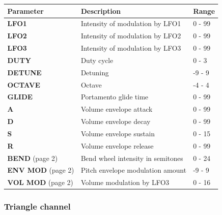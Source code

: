 \documentclass[a4paper, 12p, titlepaget]{book}
\begin{document}
\begin{tabular}{l | l | l}
  Parameter & Description & Range\\ \hline
  \textbf{LFO1} & Intensity of modulation by LFO1 & 0 - 99\\
  \textbf{LFO2} & Intensity of modulation by LFO2 & 0 - 99\\
  \textbf{LFO3} & Intensity of modulation by LFO3 & 0 - 99\\
  \textbf{DUTY} & Duty cycle & 0 - 3\\
  \textbf{DETUNE} & Detuning & -9 - 9\\
  \textbf{OCTAVE} & Octave & -4 - 4\\
  \textbf{GLIDE} & Portamento glide time & 0 - 99\\
  \textbf{A} & Volume envelope attack & 0 - 99\\
  \textbf{D} & Volume envelope decay & 0 - 99\\
  \textbf{S} & Volume envelope sustain & 0 - 15\\
  \textbf{R} & Volume envelope release & 0 - 99\\
  \textbf{BEND} (page 2) & Bend wheel intensity in semitones & 0 - 24\\
  \textbf{ENV MOD} (page 2) & Pitch envelope modulation amount & -9 - 9\\
  \textbf{VOL MOD} (page 2) & Volume modulation by LFO3 & 0 - 16\\
\end{tabular}

\subsubsection{Triangle channel}

\end{document}
